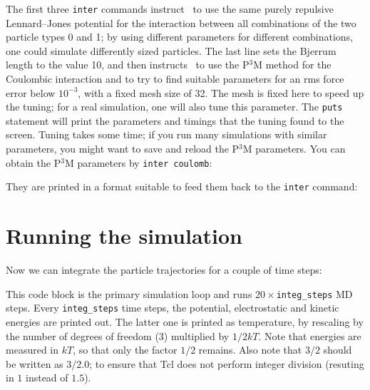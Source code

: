 \documentclass[
a4paper,                        %
11pt,                           %
twoside,                        %
footsepline,                    %
headsepline,                    %
headexclude,                    %
footexclude,                    %
pagesize,                       %
]{scrartcl}
\begin{document}
The first three \verb|inter| commands instruct \es\ to use the same
purely repulsive Lennard--Jones potential for the interaction between
all combinations of the two particle types 0 and 1; by using different
parameters for different combinations, one could simulate differently
sized particles.  The last line sets the Bjerrum length to the value
10, and then instructs \es\ to use the P$^3$M method for the Coulombic
interaction and to try to find suitable parameters for an rms force
error below $10^{-3}$, with a fixed mesh size of 32. The mesh is fixed
here to speed up the tuning; for a real simulation, one will also tune
this parameter. The \verb|puts| statement will print the parameters and
timings that the tuning found to the screen. Tuning takes some time; if you run many
simulations with similar parameters, you might want to save and reload
the P$^3$M parameters. You can obtain the P$^3$M parameters by
\verb|inter coulomb|:


They are printed in a format suitable to feed them back to the
\verb|inter| command:


\section{Running the simulation}

Now we can integrate the particle trajectories for a couple of time
steps:


This code block is the primary simulation loop and runs
$20\times$\verb|integ_steps| MD steps. Every \verb|integ_steps| time
steps, the potential, electrostatic and kinetic energies are printed
out. The latter one is printed as temperature, by rescaling by the
number of degrees of freedom (3) multiplied by $1/2kT$. Note that
energies are measured in $kT$, so that only the factor $1/2$
remains. Also note that $3/2$ should be written as $3/2.0$; to ensure
that Tcl does not perform integer division (resuting in $1$ instead of
$1.5$).
\end{document}
